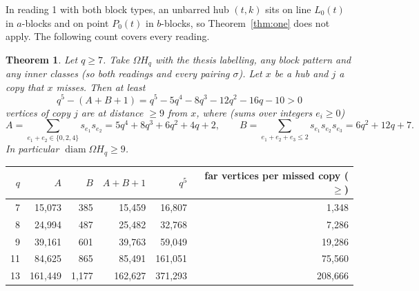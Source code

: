 \documentclass[11pt]{amsart}
\theoremstyle{plain}
\newtheorem{theorem}{Theorem}
\theoremstyle{definition}
\theoremstyle{remark}
\newcommand{\Om}{\Omega}
\begin{document}
In reading 1 with both block types, an unbarred hub $(t,k)$ sits on line $L_0(t)$ in $a$-blocks and on point $P_0(t)$ in
$b$-blocks, so Theorem~\ref{thm:one} does not apply. The following count covers every reading.

\begin{theorem}\label{thm:two}
Let $q \ge 7$. Take $\Om H_q$ with the thesis labelling, any block pattern and any inner classes (so both readings and
every pairing $\sigma$). Let $x$ be a hub and $j$ a copy that $x$ misses. Then at least
\[
q^5 - (A + B + 1) = q^5 - 5q^4 - 8q^3 - 12q^2 - 16q - 10 > 0
\]
vertices of copy $j$ are at distance $\ge 9$ from $x$, where (sums over integers $e_i \ge 0$)
\[
A = \sum_{e_1 + e_2 \in \{0,2,4\}} s_{e_1}s_{e_2} = 5q^4 + 8q^3 + 6q^2 + 4q + 2, \qquad
B = \sum_{e_1+e_2+e_3 \le 2} s_{e_1}s_{e_2}s_{e_3} = 6q^2 + 12q + 7 .
\]
In particular $\operatorname{diam} \Om H_q \ge 9$.
\end{theorem}

\begin{center}\small
\begin{tabular}{@{}rrrrrr@{}}
\toprule
$q$ & $A$ & $B$ & $A + B + 1$ & $q^5$ & far vertices per missed copy ($\ge$)\\
\midrule
7 & 15,073 & 385 & 15,459 & 16,807 & 1,348\\
8 & 24,994 & 487 & 25,482 & 32,768 & 7,286\\
9 & 39,161 & 601 & 39,763 & 59,049 & 19,286\\
11 & 84,625 & 865 & 85,491 & 161,051 & 75,560\\
13 & 161,449 & 1,177 & 162,627 & 371,293 & 208,666\\
\bottomrule
\end{tabular}
\end{center}
\end{document}
